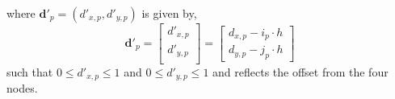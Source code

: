 \begin{enumerate}[label=4.\alph*)]
	where $\mathbf{d}'_p = (d'_{x,p},d'_{y,p})$ is given by,
			\begin{equation}
			\mathbf{d}'_p = 
			\begin{bmatrix}
			d'_{x,p}\\
			d'_{y,p}\\
			\end{bmatrix} = \begin{bmatrix}
			d_{x,p} - i_p\cdot{h}  \\
			d_{y,p} - j_p\cdot{h}
			\end{bmatrix}
			\end{equation}
	such that $0\leqslant{d}'_{x,p}\leqslant1$ and $0\leqslant{d}'_{y,p}\leqslant1$ and reflects the offset from the four nodes.
%	
%	
%	
%
%	
%	
%	
	

\end{enumerate}
